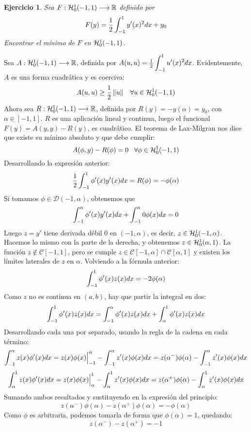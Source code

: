 \documentclass[12pt]{article}
\newtheorem{ejercicio}{Ejercicio}
\theoremstyle{definition}
\theoremstyle{remark}
\begin{document}
\begin{ejercicio}
Sea $\funcion{F}{\sobolevcero[-1,1]{1}}{\R}$ definido por
\[
F(y)=\frac{1}{2}\integral{-1}{1}{y'(x)^2dx}+y_0
\]
Encontrar el mínimo de $F$ en $\sobolevcero[-1,1]{1}$.
\end{ejercicio}

Sea $\funcion{A}{\sobolevcero[-1,1]{1}}{\R}$, definida por $A(u,u)=\frac{1}{2}\integral{-1}{1}{u'(x)^2dx}$. Evidentemente, $A$ es una forma cuadrática y es coerciva:
\[
A(u,u)\geq \frac{1}{2}\norm{u} \espacio \forall u\in\sobolevcero[-1,1]{1}
\]
Ahora sea $\funcion{R}{\sobolevcero[-1,1]{1}}{\R}$, definida por $R(y)=-y(\alpha)=y_0$, con $\alpha\in[-1,1]$. $R$ es una aplicación lineal y continua, luego el funcional $F(y)=A(y,y)-R(y)$, es cuadrático. El teorema de Lax-Milgran nos dice que existe su mínimo absoluto y que debe cumplir:
\[
A(\phi,y)-R(\phi)=0 \espacio \forall \phi\in\sobolevcero[-1,1]{1}
\]
Desarrollando la expresión anterior:
\[
\frac{1}{2}\integral{-1}{1}{\phi'(x)y'(x)dx}=R(\phi)=-\phi(\alpha)
\]
Si tomamos $\phi\in \mathcal{D}(-1,\alpha)$, obtenemos que 
\[
\integral{-1}{\alpha}{\phi'(x)y'(x)dx}+\integral{-1}{\alpha}{0\phi(x)dx}=0
\]
Luego $z=y'$ tiene derivada débil 0 en $(-1,\alpha)$, es decir, $z\in\sobolevcero[-1,\alpha]{1}$. Hacemos lo mismo con la parte de la derecha, y obtenemos $z\in\sobolevcero[\alpha,1]{1}$. La función $z\notin\mathcal{C}[-1,1]$, pero se cumple $z\in\mathcal{C}[-1,\alpha]\cap\mathcal{C}[\alpha,1]$ y existen los límites laterales de $z$ en $\alpha$. Volviendo a la fórmula anterior:
\[
\integral{-1}{1}{\phi'(x)z(x)dx}=-2\phi(\alpha)
\]
Como $z$ no es continua en $(a,b)$, hay que partir la integral en dos:
\[
\integral{-1}{1}{\phi'(x)z(x)dx}=\integral{-1}{\alpha}{\phi'(x)z(x)dx}+\integral{\alpha}{1}{\phi'(x)z(x)dx}
\]
Desarrollando cada una por separado, usando la regla de la cadena en cada término:
\[
\integral{-1}{\alpha}{z(x)\phi'(x)dx}=z(x)\phi(x)\Big|^\alpha_{-1}-\integral{-1}{\alpha}{z'(x)\phi(x)dx}=z(\alpha^-)\phi(\alpha)-\integral{-1}{\alpha}{z'(x)\phi(x)dx}
\]
\[
\integral{\alpha}{1}{z(x)\phi'(x)dx}=z(x)\phi(x)\Big|_\alpha^{1}-\integral{\alpha}{1}{z'(x)\phi(x)dx}=z(\alpha^+)\phi(\alpha)-\integral{\alpha}{1}{z'(x)\phi(x)dx}
\]
Sumando ambos resultados y sustituyendo en la expresión del principio:
\[
z(\alpha^-)\phi(\alpha)-z(\alpha^+)\phi(\alpha)=-\phi(\alpha)
\]
Como $\phi$ es arbitraria, podemos tomarla de forma que $\phi(\alpha)=1$, quedando:
\[
z(\alpha^-)-z(\alpha^+)=-1
\]
\end{document}
